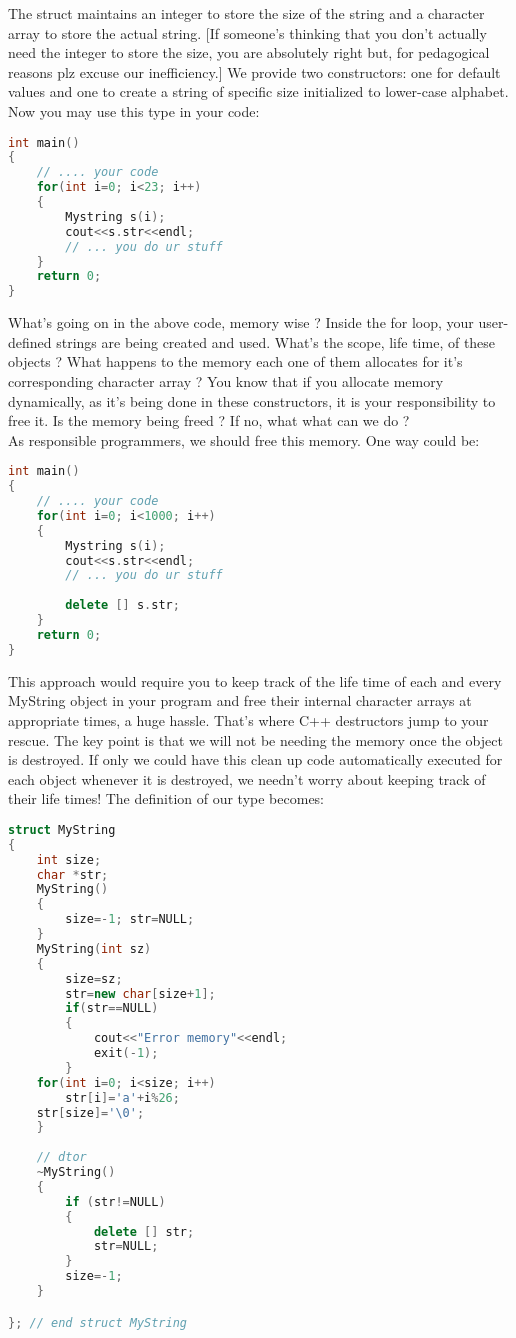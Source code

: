 \documentclass[11pt,fleqn]{book} %
\begin{document}
The struct maintains an integer to store the size of the string and a character array to store the actual string. [If someone's thinking that you don't actually need the integer to store the size, you are absolutely right but, for pedagogical reasons plz excuse our inefficiency.] We provide two constructors: one for default values and one to create a string of specific size initialized to lower-case alphabet. Now you may use this type in your code:
\begin{lstlisting}[language=C++, caption = Use MyString in main()]
int main() 
{
	// .... your code
	for(int i=0; i<23; i++)
	{
		Mystring s(i);
		cout<<s.str<<endl;
		// ... you do ur stuff
	}
	return 0;
}
\end{lstlisting}

What's going on in the above code, memory wise ? Inside the for loop, your user-defined strings are being created and used. What's the scope, life time, of these objects ? What happens to the memory each one of them allocates for it's corresponding character array ? You know that if you allocate memory dynamically, as it's being done in these constructors, it is your responsibility to free it. Is the memory being freed ? If no, what what can we do ? \smallskip
~\\
\noindent As responsible programmers, we should free this memory. One way could be:
\begin{lstlisting}[language=C++, caption = Free memory in main()]
int main() 
{
	// .... your code
	for(int i=0; i<1000; i++)
	{
		Mystring s(i);
		cout<<s.str<<endl;
		// ... you do ur stuff
		
		delete [] s.str;
	}
	return 0;
}

\end{lstlisting}

\noindent This approach would require you to keep track of the life time of each and every MyString object in your program and free their internal character arrays at appropriate times, a huge hassle. That's where C++ destructors jump to your rescue. The key point is that we will not be needing the memory once the object is destroyed. If only we could have this clean up code automatically executed for each object whenever it is destroyed, we needn't worry about keeping track of their life times! The definition of our type becomes:
\begin{lstlisting}[language=C++, caption = Destructor]
struct MyString 
{
	int size;
	char *str;
	MyString()
	{
		size=-1; str=NULL;
	} 
	MyString(int sz)
	{
		size=sz;
		str=new char[size+1];
		if(str==NULL)
		{
			cout<<"Error memory"<<endl;
			exit(-1);
		} 
	for(int i=0; i<size; i++)
		str[i]='a'+i%26;
	str[size]='\0';
	}
	
	// dtor
	~MyString()
	{
		if (str!=NULL)
		{
			delete [] str;
			str=NULL;
		} 
		size=-1; 
	}

}; // end struct MyString
\end{lstlisting}
\end{document}
